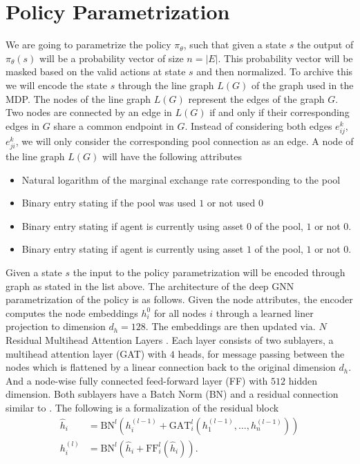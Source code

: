 \section{Policy Parametrization}
We are going to parametrize the policy $\pi_\theta$, such that given a state
$s$ the output of $\pi_\theta(s)$ will be a probability vector of size $n = |E|$.
This probability vector will be masked based on the valid actions at state
$s$ and then normalized. To archive this we will encode the state $s$ through
the line graph $L(G)$ of the graph used in the MDP. The nodes of the line
graph $L(G)$ represent the edges of the graph $G$. Two nodes are connected by
an edge in $L(G)$ if and only if their corresponding edges in $G$ share a
common endpoint in $G$. Instead of considering both edges $e_{ij}^{k}$,
$e_{ji}^{k}$, we will only consider the corresponding pool connection as an
edge. A node of the line graph $L(G)$ will have the following attributes
\begin{itemize}[nosep]
    \item Natural logarithm of the marginal exchange rate corresponding to
        the pool
    \item Binary entry stating if the pool was used $1$ or not used $0$
    \item Binary entry stating if agent is currently using asset $0$ of the
        pool, $1$ or not
        $0$.
    \item Binary entry stating if agent is currently using asset $1$ of the
        pool, $1$ or not
        $0$.
\end{itemize}
Given a state $s$ the input to the policy parametrization will be encoded
through graph as stated in the list above. The architecture of the deep GNN
parametrization of the policy is as follows. Given the node attributes, the
encoder computes the node embeddings $h_i^{0}$ for all nodes $i$ through a
learned liner projection to dimension $d_h = 128$. The embeddings are then
updated via. $N$ Residual Multihead Attention Layers \cite{gatv2}. Each layer
consists of two sublayers, a multihead attention layer (GAT) with $4$ heads,
for message passing between the nodes which is flattened by a linear
connection back to the original dimension $d_h$. And a node-wise fully
connected feed-forward layer (FF) with $512$ hidden dimension. Both
sublayers have a Batch Norm (BN) and a residual connection similar to
\cite{rl_coopt}. The following is a formalization of the residual block
\begin{align}
    \hat{h}_{i} &= \text{BN}^{l}\left( h_i^{(l-1)}
    + \text{GAT}_i^{l}(h_1^{(l-1)},\ldots,h_n^{(l-1)})\right)\\
    h_i^{(l)} &= \text{BN}^{l}\left( \hat{h}_{i} + \text{FF}_i^{l}(\hat{h}_i) \right).
\end{align}

